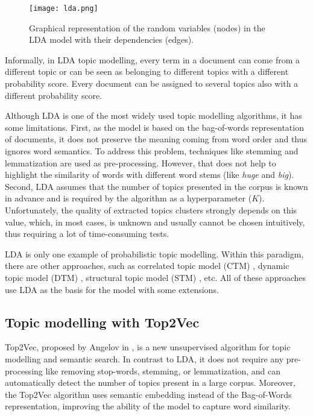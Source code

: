 \documentclass[fontsize=12pt,a4paper,twoside,openany]{scrbook}
\begin{document}
\begin{figure}[h]
\centering
\texttt{[image: lda.png]}
\caption{Graphical representation of the random variables (nodes) in the LDA model with their dependencies (edges).}
\label{fig:lda}
\end{figure}

Informally, in LDA topic modelling, every term in a document can come from a different topic or can be seen as belonging to different topics with a different probability score. Every document can be assigned to several topics also with a different probability score.

Although LDA is one of the most widely used topic modelling algorithms, it has some limitations. First, as the model is based on the bag-of-words representation of documents, it does not preserve the meaning coming from word order and thus ignores word semantics. To address this problem, techniques like stemming and lemmatization are used as pre-processing. However, that does not help to highlight the similarity of words with different word stems (like \emph{huge} and \emph{big}). Second, LDA assumes that the number of topics presented in the corpus is known in advance and is required by the algorithm as a hyperparameter (\(K\)). Unfortunately, the quality of extracted topics clusters strongly depends on this value, which, in most cases, is unknown and usually cannot be chosen intuitively, thus requiring a lot of time-consuming tests. 

LDA is only one example of probabilistic topic modelling. Within this paradigm, there are other approaches, such as correlated topic model (CTM) \parencite{Blei05}, dynamic topic model (DTM) \parencite{Blei06}, structural topic model (STM) \parencite{Roberts13}, etc. All of these approaches use LDA as the basis for the model with some extensions.

\subsection{Topic modelling with Top2Vec}
\label{sec:Top2Vec}

Top2Vec, proposed by Angelov in \cite*{Angelov20}, is a new unsupervised algorithm for topic modelling and semantic search. In contrast to LDA, it does not require any pre-processing like removing stop-words, stemming, or lemmatization, and can automatically detect the number of topics present in a large corpus. Moreover, the Top2Vec algorithm uses semantic embedding instead of the Bag-of-Words representation, improving the ability of the model to capture word similarity.
\end{document}
